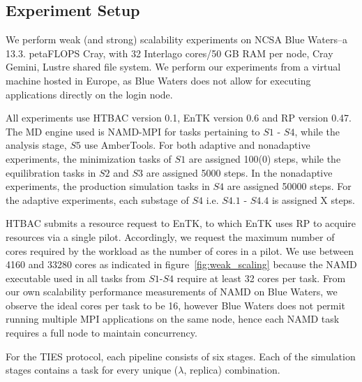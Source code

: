 
\subsection{Experiment Setup}\label{ssec:exp_design}

We perform weak (and strong) scalability experiments on NCSA Blue Waters--a
13.3. petaFLOPS Cray, with 32 Interlago cores/50 GB RAM per node, Cray Gemini,
Lustre shared file system. We perform our experiments from a virtual machine
hosted in Europe, as Blue Waters does not allow for executing applications
directly on the login node.

All experiments use HTBAC version 0.1, EnTK version 0.6 and RP version 0.47.
The MD engine used is NAMD-MPI for tasks pertaining to $S1$ - $S4$, while the
analysis stage, $S5$ use AmberTools. For both adaptive and nonadaptive
experiments, the minimization tasks of $S1$ are assigned 100(0) steps, while
the equilibration tasks in $S2$ and $S3$ are assigned 5000 steps. In the
nonadaptive experiments, the production simulation tasks in $S4$ are assigned
50000 steps. For the adaptive experiments, each substage of $S4$ i.e. $S4.1$ -
$S4.4$ is assigned X steps.

HTBAC submits a resource request to EnTK, to which EnTK uses RP to acquire
resources via a single pilot. Accordingly, we request the maximum number of
cores required by the workload as the number of cores in a pilot. We use
between 4160 and 33280 cores as indicated in figure~\ref{fig:weak_scaling}
because the NAMD executable used in all tasks from $S1$-$S4$ require at least
32 cores per task. From our own scalability performance measurements of NAMD
on Blue Waters, we observe the ideal cores per task to be 16, however Blue
Waters does not permit running multiple MPI applications on the same node,
hence each NAMD task requires a full node to maintain concurrency.


For the TIES protocol, each pipeline consists of six stages. Each of the simulation
stages contains a task for every unique ($\lambda$, replica) combination.




